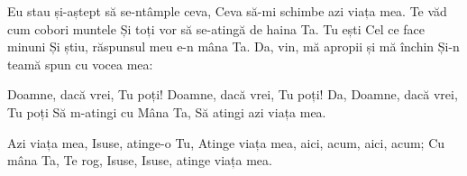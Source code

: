 \beginverse
Eu stau și-aștept să se-ntâmple ceva,
Ceva să-mi schimbe azi viața mea.
Te văd cum cobori muntele
Și toți vor să se-atingă de haina Ta.
Tu ești Cel ce face minuni
Și știu, răspunsul meu e-n mâna Ta.
Da, vin, mă apropii și mă închin
Și-n teamă spun cu vocea mea:
\endverse

\beginchorus
Doamne, dacă vrei, Tu poți!
Doamne, dacă vrei, Tu poți!
Da, Doamne, dacă vrei, Tu poți
Să m-atingi cu Mâna Ta,
Să atingi azi viața mea.
\endchorus

\beginverse
Azi viața mea, Isuse, atinge-o Tu,
Atinge viața mea, aici, acum, aici, acum;
Cu mâna Ta, Te rog, Isuse,
Isuse, atinge viața mea.
\endverse
\endsong